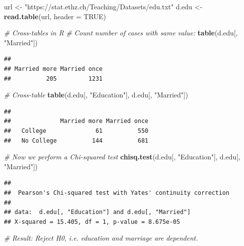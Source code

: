 \documentclass[
]{article}
\newenvironment{Shaded}{\begin{snugshade}}{\end{snugshade}}
\newcommand{\AttributeTok}[1]{\textcolor[rgb]{0.13,0.29,0.53}{#1}}
\newcommand{\CommentTok}[1]{\textcolor[rgb]{0.56,0.35,0.01}{\textit{#1}}}
\newcommand{\ConstantTok}[1]{\textcolor[rgb]{0.56,0.35,0.01}{#1}}
\newcommand{\FunctionTok}[1]{\textcolor[rgb]{0.13,0.29,0.53}{\textbf{#1}}}
\newcommand{\NormalTok}[1]{#1}
\newcommand{\OtherTok}[1]{\textcolor[rgb]{0.56,0.35,0.01}{#1}}
\newcommand{\StringTok}[1]{\textcolor[rgb]{0.31,0.60,0.02}{#1}}
\begin{document}
\begin{Shaded}
\begin{Highlighting}[]
\NormalTok{url }\OtherTok{\textless{}{-}} \StringTok{"https://stat.ethz.ch/Teaching/Datasets/edu.txt"}
\NormalTok{d.edu }\OtherTok{\textless{}{-}} \FunctionTok{read.table}\NormalTok{(url, }\AttributeTok{header =} \ConstantTok{TRUE}\NormalTok{)}

\CommentTok{\# Cross{-}tables in R}
\CommentTok{\# Count number of cases with same value:}
\FunctionTok{table}\NormalTok{(d.edu[, }\StringTok{"Married"}\NormalTok{])}
\end{Highlighting}
\end{Shaded}

\begin{verbatim}
## 
## Married more Married once 
##          205         1231
\end{verbatim}

\begin{Shaded}
\begin{Highlighting}[]
\CommentTok{\# Cross{-}table}
\FunctionTok{table}\NormalTok{(d.edu[, }\StringTok{"Education"}\NormalTok{], d.edu[, }\StringTok{"Married"}\NormalTok{])}
\end{Highlighting}
\end{Shaded}

\begin{verbatim}
##             
##              Married more Married once
##   College              61          550
##   No College          144          681
\end{verbatim}

\begin{Shaded}
\begin{Highlighting}[]
\CommentTok{\# Now we perform a Chi{-}squared test}
\FunctionTok{chisq.test}\NormalTok{(d.edu[, }\StringTok{"Education"}\NormalTok{], d.edu[, }\StringTok{"Married"}\NormalTok{])}
\end{Highlighting}
\end{Shaded}

\begin{verbatim}
## 
##  Pearson's Chi-squared test with Yates' continuity correction
## 
## data:  d.edu[, "Education"] and d.edu[, "Married"]
## X-squared = 15.405, df = 1, p-value = 8.675e-05
\end{verbatim}

\begin{Shaded}
\begin{Highlighting}[]
\CommentTok{\# Result: Reject H0, i.e. education and marriage are dependent.}
\end{Highlighting}
\end{Shaded}
\end{document}
